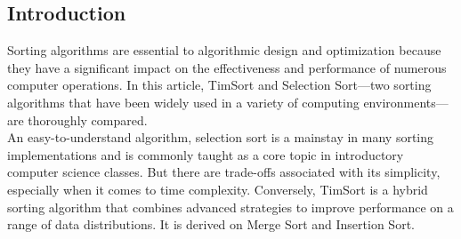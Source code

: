 \documentclass[article,10pt]{article}
\begin{document}
\begin{multicols}{2}
\section{Introduction}


Sorting algorithms are essential to algorithmic design and optimization because they have a significant impact on the effectiveness and performance of numerous computer operations. In this article, TimSort\cite{peters2015TimSort} and Selection Sort\cite{Knuth-Selection}—two sorting algorithms that have been widely used in a variety of computing environments—are thoroughly compared.\\

An easy-to-understand algorithm, selection sort is a mainstay in many sorting implementations and is commonly taught as a core topic in introductory computer science classes. But there are trade-offs associated with its simplicity, especially when it comes to time complexity. Conversely, TimSort is a hybrid sorting algorithm that combines advanced strategies to improve performance on a range of data distributions. It is derived on Merge Sort and Insertion Sort.\\



\end{multicols}
\end{document}
